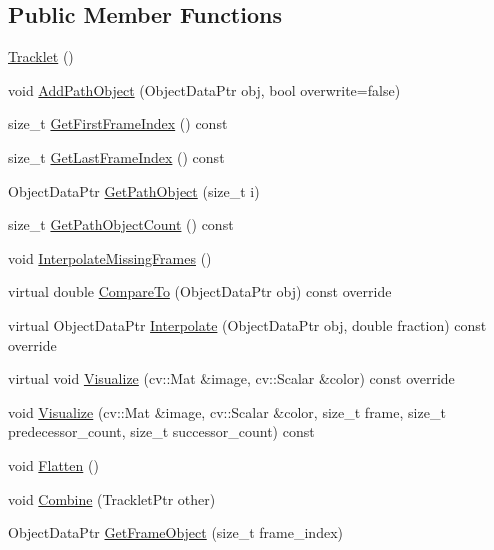 \subsection*{Public Member Functions}
\begin{DoxyCompactItemize}
\item 
\hyperlink{classcore_1_1Tracklet_aedf59b5a9a068a28bb7570f2a031d4e7}{Tracklet} ()
\item 
void \hyperlink{classcore_1_1Tracklet_ab0b397f2d0685a927de886dbd36c3bc8}{Add\+Path\+Object} (Object\+Data\+Ptr obj, bool overwrite=false)
\item 
size\+\_\+t \hyperlink{classcore_1_1Tracklet_a1b963319d6c65614baec02a925f31691}{Get\+First\+Frame\+Index} () const
\item 
size\+\_\+t \hyperlink{classcore_1_1Tracklet_ad8e195b523cf2021394455cc21867d96}{Get\+Last\+Frame\+Index} () const
\item 
Object\+Data\+Ptr \hyperlink{classcore_1_1Tracklet_a9758349e8f25c479ffc4b21a90149a81}{Get\+Path\+Object} (size\+\_\+t i)
\item 
size\+\_\+t \hyperlink{classcore_1_1Tracklet_aee4298a7b734b2b7533d4536006a8aa8}{Get\+Path\+Object\+Count} () const
\item 
void \hyperlink{classcore_1_1Tracklet_a10b56b608b24ef547550540e5a755bce}{Interpolate\+Missing\+Frames} ()
\item 
virtual double \hyperlink{classcore_1_1Tracklet_a0357f2fa173941800571432dcbc96dc2}{Compare\+To} (Object\+Data\+Ptr obj) const override
\item 
virtual Object\+Data\+Ptr \hyperlink{classcore_1_1Tracklet_a5fb5e6ab9df668c3477e8b52f115b188}{Interpolate} (Object\+Data\+Ptr obj, double fraction) const override
\item 
virtual void \hyperlink{classcore_1_1Tracklet_a85f92a4059bf89f24a83f28935675181}{Visualize} (cv\+::\+Mat \&image, cv\+::\+Scalar \&color) const override
\item 
void \hyperlink{classcore_1_1Tracklet_a3a2b241939559e47aef701d2e2c4d4bd}{Visualize} (cv\+::\+Mat \&image, cv\+::\+Scalar \&color, size\+\_\+t frame, size\+\_\+t predecessor\+\_\+count, size\+\_\+t successor\+\_\+count) const
\item 
void \hyperlink{classcore_1_1Tracklet_a2bdb2f2c8249145808e7029dde6e7df0}{Flatten} ()
\item 
void \hyperlink{classcore_1_1Tracklet_a5bbbf1e2858edaad93c04cc663afeeff}{Combine} (Tracklet\+Ptr other)
\item 
Object\+Data\+Ptr \hyperlink{classcore_1_1Tracklet_a5a0e56045f8c1868b46db87700658260}{Get\+Frame\+Object} (size\+\_\+t frame\+\_\+index)
\end{DoxyCompactItemize}


